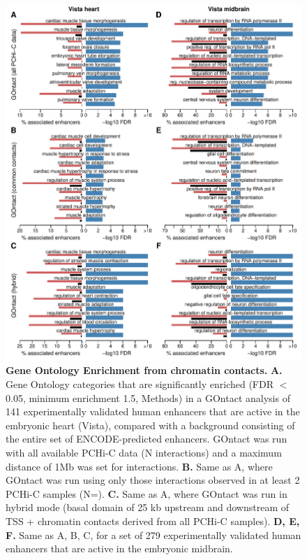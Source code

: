 \begin{figure}[hbt!]
 \centering
 \includegraphics[width=1\textwidth, page=1] {figures/GOntact/Figure3.pdf}
 \caption[Gene Ontology Enrichment from chromatin contacts.]{
 \textbf{Gene Ontology Enrichment from chromatin contacts.}
 \textbf{A.} Gene Ontology categories that are significantly enriched (FDR $<$ 0.05, minimum enrichment 1.5, Methods) in a GOntact analysis of 141 experimentally validated human enhancers that are active in the embryonic heart (Vista), compared with a background consisting of the entire set of ENCODE-predicted enhancers. GOntact was run with all available PCHi-C data (N interactions) and a maximum distance of 1Mb was set for interactions.
 \textbf{B.} Same as A, where GOntact was run using only those interactions observed in at least 2 PCHi-C samples (N=). 
 \textbf{C.} Same as A, where GOntact was run in hybrid mode (basal domain of 25 kb upstream and downstream of TSS + chromatin contacts derived from all PCHi-C samples). 
 \textbf{D, E, F.} Same as A, B, C, for a set of 279 experimentally validated human enhancers that are active in the embryonic midbrain. 
 \\
 }
 \label{fig:GOntact-fig3}
\end{figure} 

